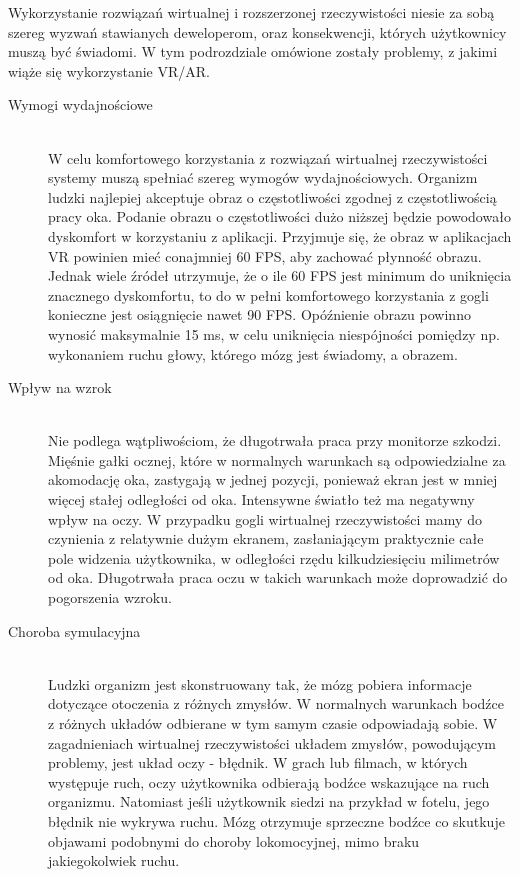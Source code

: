 \documentclass[a4paper,11pt,twoside]{report}
\theoremstyle{definition}
\begin{document}
Wykorzystanie rozwiązań wirtualnej i rozszerzonej rzeczywistości niesie za sobą szereg wyzwań stawianych deweloperom, oraz konsekwencji, których użytkownicy muszą być świadomi. W tym podrozdziale omówione zostały problemy, z jakimi wiąże się wykorzystanie VR/AR\cite{VRdifficulties}.

\begin{description}
\item [Wymogi wydajnościowe] \hfill \\
W celu komfortowego korzystania z rozwiązań wirtualnej rzeczywistości systemy muszą spełniać szereg wymogów wydajnościowych. Organizm ludzki najlepiej akceptuje obraz o częstotliwości zgodnej z częstotliwością pracy oka. Podanie obrazu o częstotliwości dużo niższej będzie powodowało dyskomfort w korzystaniu z aplikacji. Przyjmuje się, że obraz w aplikacjach VR powinien mieć conajmniej 60 FPS, aby zachować płynność obrazu. Jednak wiele źródeł utrzymuje, że o ile 60 FPS jest minimum do uniknięcia znacznego dyskomfortu, to do w pełni komfortowego korzystania z gogli konieczne jest osiągnięcie nawet 90 FPS\cite{VRframesPerSecond}. Opóźnienie obrazu powinno wynosić maksymalnie 15 ms\cite{VRlatency}, w celu uniknięcia niespójności pomiędzy np. wykonaniem ruchu głowy, którego mózg jest świadomy, a obrazem.
\item [Wpływ na wzrok] \hfill \\
Nie podlega wątpliwościom, że długotrwała praca przy monitorze szkodzi. Mięśnie gałki ocznej, które w normalnych warunkach są odpowiedzialne za akomodację oka, zastygają w jednej pozycji, ponieważ ekran jest w mniej więcej stałej odległości od oka. Intensywne światło też ma negatywny wpływ na oczy. W przypadku gogli wirtualnej rzeczywistości mamy do czynienia z relatywnie dużym ekranem, zasłaniającym praktycznie całe pole widzenia użytkownika, w odległości rzędu kilkudziesięciu milimetrów od oka. Długotrwała praca oczu w takich warunkach może doprowadzić do pogorszenia wzroku.
\item [Choroba symulacyjna] \hfill \\
Ludzki organizm jest skonstruowany tak, że mózg pobiera informacje dotyczące otoczenia z różnych zmysłów. W normalnych warunkach bodźce z różnych układów odbierane w tym samym czasie odpowiadają sobie. W zagadnieniach wirtualnej rzeczywistości układem zmysłów, powodującym problemy, jest układ oczy - błędnik. W grach lub filmach, w których występuje ruch, oczy użytkownika odbierają bodźce wskazujące na ruch organizmu. Natomiast jeśli użytkownik siedzi na przykład w fotelu, jego błędnik nie wykrywa ruchu. Mózg otrzymuje sprzeczne bodźce co skutkuje objawami podobnymi do choroby lokomocyjnej, mimo braku jakiegokolwiek ruchu.\cite{VRsickness}

\end{description}
\end{document}
